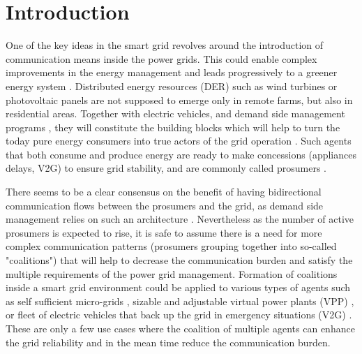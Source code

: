 \documentclass[conference]{IEEEtran}
\begin{document}
\section{Introduction}
\label{sec:introduction}

One of the key ideas in the smart grid revolves around the introduction of communication means inside the power grids. This could enable complex improvements in the energy management and leads progressively to a greener energy system \cite{Ramchurn} \cite{WuHamedHuangBook2011}. Distributed energy resources (DER) such as wind turbines or photovoltaic panels are not supposed to emerge only in remote farms, but also in residential areas. Together with electric vehicles, and demand side management programs \cite{Samadi2014}, they will constitute the building blocks which will help to turn the today pure energy consumers into true actors of the grid operation \cite{Ramchurn}. Such agents that both consume and produce energy are ready to make concessions (appliances delays, V2G) to ensure grid stability, and are commonly called prosumers \cite{6883384,Ramchurn}.

There seems to be a clear consensus on the benefit of having bidirectional communication flows between the prosumers and the grid, as demand side management relies on such an architecture \cite{WuHamedHuangBook2011}. Nevertheless as the number of active prosumers is expected to rise, it is safe to assume there is a need for more complex communication patterns (prosumers grouping together into so-called "coalitions") that will help to decrease the communication burden and satisfy the multiple requirements of the power grid management. Formation of coalitions inside a smart grid environment could be applied to various types of agents such as self sufficient micro-grids \cite{Pahwa}, sizable and adjustable virtual power plants (VPP) \cite{Braun, Ramchurn}, or fleet of electric vehicles that back up the grid in emergency situations (V2G) \cite{Ramchurn}. These are only a few use cases where the coalition of multiple agents can enhance the grid reliability and in the mean time reduce the communication burden.
\end{document}

